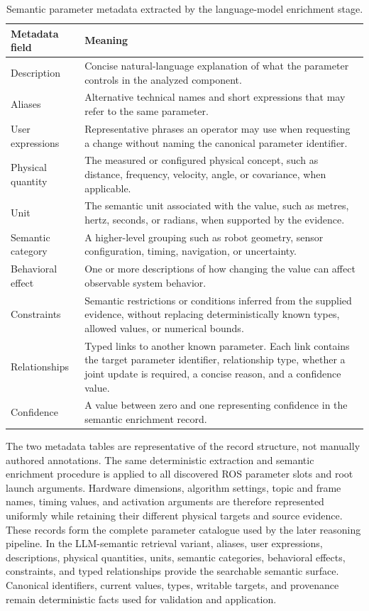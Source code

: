 \begin{table}[htbp]
\centering
\caption{Semantic parameter metadata extracted by the language-model enrichment stage.}
\label{tab:llm-parameter-metadata}
\begin{tabular}{p{} p{}}
\hline
\textbf{Metadata field} & \textbf{Meaning} \\
\hline
Description & Concise natural-language explanation of what the parameter controls in the analyzed component. \\
Aliases & Alternative technical names and short expressions that may refer to the same parameter. \\
User expressions & Representative phrases an operator may use when requesting a change without naming the canonical parameter identifier. \\
Physical quantity & The measured or configured physical concept, such as distance, frequency, velocity, angle, or covariance, when applicable. \\
Unit & The semantic unit associated with the value, such as metres, hertz, seconds, or radians, when supported by the evidence. \\
Semantic category & A higher-level grouping such as robot geometry, sensor configuration, timing, navigation, or uncertainty. \\
Behavioral effect & One or more descriptions of how changing the value can affect observable system behavior. \\
Constraints & Semantic restrictions or conditions inferred from the supplied evidence, without replacing deterministically known types, allowed values, or numerical bounds. \\
Relationships & Typed links to another known parameter. Each link contains the target parameter identifier, relationship type, whether a joint update is required, a concise reason, and a confidence value. \\
Confidence & A value between zero and one representing confidence in the semantic enrichment record. \\
\hline
\end{tabular}
\end{table}

The two metadata tables are representative of the record structure, not manually authored annotations. The same deterministic extraction and semantic enrichment procedure is applied to all discovered ROS parameter slots and root launch arguments. Hardware dimensions, algorithm settings, topic and frame names, timing values, and activation arguments are therefore represented uniformly while retaining their different physical targets and source evidence. These records form the complete parameter catalogue used by the later reasoning pipeline. In the LLM-semantic retrieval variant, aliases, user expressions, descriptions, physical quantities, units, semantic categories, behavioral effects, constraints, and typed relationships provide the searchable semantic surface. Canonical identifiers, current values, types, writable targets, and provenance remain deterministic facts used for validation and application.

